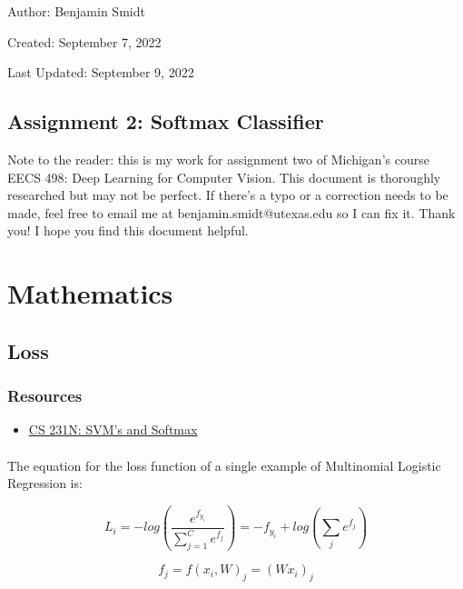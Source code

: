 \documentclass[12pt]{article}
\begin{document}
\noindent Author: Benjamin Smidt

\noindent Created: September 7, 2022

\noindent Last Updated: September 9, 2022
\begin{center}
\section*{Assignment 2: Softmax Classifier}
\end{center}

\noindent Note to the reader: this is my work for assignment two of Michigan's course
EECS 498: Deep Learning for Computer Vision. This document is thoroughly researched but
may not be perfect. If there's a typo or a correction needs to be made, feel free to 
email me at benjamin.smidt@utexas.edu so I can fix it. Thank you! I hope you find this 
document helpful.

\tableofcontents{}

\section{Mathematics}
\subsection{Loss}
\subsubsection*{Resources}

\begin{itemize}
    \item \href{https://cs231n.github.io/linear-classify/#svm-vs-softmax}{CS 231N: SVM's and Softmax }
\end{itemize}

\paragraph{}
The equation for the loss function of a single example of 
Multinomial Logistic Regression is:  

\begin{equation}
    L_{i} = -log(\frac{e^{f_{y_{i}}}}{\sum_{j=1}^C e^{f_j}}) 
    = -f_{y_{i}} + log(\sum_{j} e^{f_{j}})
\end{equation}

\begin{equation}
    f_j = f(x_{i}, W)_j = (Wx_{i})_j
\end{equation}
\end{document}
